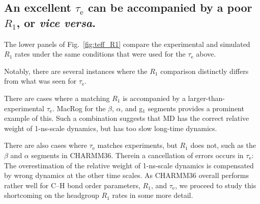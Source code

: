 \documentclass[journal=jcisd8,manuscript=article,layout=twocolumn]{achemso}
\begin{document}
\subsection*{An excellent $\tau_\mathrm e$ can be accompanied by a poor $R_1$, or \emph{vice versa}.}
The lower panels of Fig.~\ref{fig:teff_R1} compare the experimental and simulated $R_{1}$ rates under the same conditions that were used for the $\tau_\mathrm{e}$ above.
%

%
Notably, there are several instances where the $R_1$ comparison distinctly differs from what was seen for $\tau_\mathrm{e}$.

There are cases where
a matching $R_{1}$ is accompanied by a larger-than-experimental $\tau_\mathrm{e}$.
MacRog for the $\beta$, $\alpha$, and g$_1$ segments provides a prominent example
of this.
Such a combination suggests that MD has the correct relative weight of 1-ns-scale dynamics, but has too slow long-time dynamics.

There are also cases
where $\tau_\mathrm{e}$ matches experiments, but $R_1$ does not, such as
the $\beta$ and $\alpha$ segments in CHARMM36.
Therein a cancellation of errors occurs in $\tau_\mathrm{e}$: The
overestimation of the relative weight of
1-ns-scale dynamics is compensated by wrong dynamics at the other time scales.
As CHARMM36 overall performs rather well for C--H bond order parameters, $R_1$, and $\tau_\mathrm{e}$,
we proceed to study this shortcoming on the headgroup $R_1$ rates
in some more detail.
%
\end{document}
